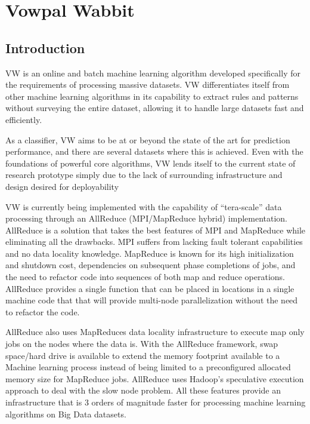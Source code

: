 \section{Vowpal Wabbit}
\subsection{Introduction}

\ac{VW} is an online and batch machine learning algorithm developed specifically for the requirements of processing massive datasets. \ac{VW} differentiates itself from other machine learning algorithms in its capability to extract rules and patterns without surveying the entire dataset, allowing it to handle large datasets fast and efficiently.

As a classifier, \ac{VW} aims to be at or beyond the state of the art for prediction performance, and there are several datasets where this is achieved. Even with the foundations of powerful core algorithms, \ac{VW} lends itself to the current state of research prototype simply due to the lack of surrounding infrastructure and design desired for deployability

\ac{VW} is currently being implemented with the capability of “tera-scale” data processing through an AllReduce (MPI/MapReduce hybrid) implementation. AllReduce is a solution that takes the best features of \ac{MPI} and MapReduce while eliminating all the drawbacks. \ac{MPI} suffers from lacking fault tolerant capabilities and no data locality knowledge. MapReduce is known for its high initialization and shutdown cost, dependencies on subsequent phase completions of jobs, and the need to refactor code into sequences of both map and reduce operations. AllReduce provides a single function that can be placed in locations in a single machine code that that will provide multi-node parallelization without the need to refactor the code.

AllReduce also uses MapReduces data locality infrastructure to execute map only jobs on the nodes where the data is. With the AllReduce framework, swap space/hard drive is available to extend the memory footprint available to a Machine learning process instead of being limited to a preconfigured allocated memory size for MapReduce jobs. AllReduce uses Hadoop’s speculative execution approach to deal with the slow node problem. All these features provide an infrastructure that is 3 orders of magnitude faster for processing machine learning algorithms on Big Data datasets.

